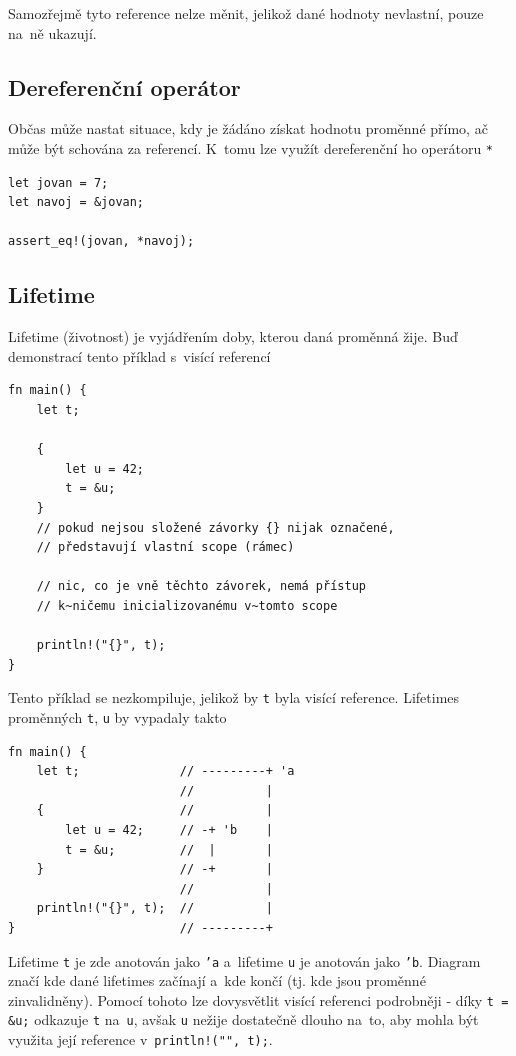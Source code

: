 \documentclass[a4paper, 12pt, twoside]{article} %
\newcommand{\rust}[1]{\texttt{#1}}
\begin{document}
			Samozřejmě tyto reference nelze měnit, jelikož dané hodnoty nevlastní, pouze na~ně ukazují.


		\subsection{Dereferenční operátor}
			Občas může nastat situace, kdy je žádáno získat hodnotu proměnné přímo, ač může být schována za referencí. K~tomu lze využít dereferenční ho operátoru \rust{*}
			\begin{verbatim} 
let jovan = 7;
let navoj = &jovan;

assert_eq!(jovan, *navoj);
			\end{verbatim}
		
		\subsection{Lifetime}
			Lifetime (životnost) je vyjádřením doby, kterou daná proměnná žije. Buď demonstrací tento příklad s~visící referencí
			\begin{verbatim}
fn main() {
	let t;

	{
		let u = 42;
		t = &u;
	}
	// pokud nejsou složené závorky {} nijak označené,
	// představují vlastní scope (rámec)

	// nic, co je vně těchto závorek, nemá přístup
	// k~ničemu inicializovanému v~tomto scope

	println!("{}", t);
}
			\end{verbatim}
			
			Tento příklad se nezkompiluje, jelikož by \rust{t} byla visící reference. Lifetimes proměnných \rust{t}, \rust{u} by vypadaly takto
			\begin{verbatim}
fn main() {
	let t;              // ---------+ 'a
						//          |
	{                   //          |
		let u = 42;     // -+ 'b    |
		t = &u;         //  |       |
	}                   // -+       |
						//          |
	println!("{}", t);  //          |
}                       // ---------+
			\end{verbatim}
			
			Lifetime \rust{t} je zde anotován jako \rust{'a} a~lifetime \rust{u} je anotován jako \rust{'b}. Diagram značí kde dané lifetimes začínají a~kde končí (tj. kde jsou proměnné zinvalidněny). Pomocí tohoto lze dovysvětlit visící referenci podrobněji - díky \rust{t = &u;} odkazuje \rust{t} na~\rust{u}, avšak \rust{u} nežije dostatečně dlouho na~to, aby mohla být využita její reference v~\rust{println!("{}", t);}.
			
\end{document}
